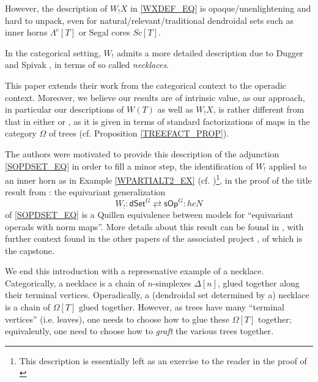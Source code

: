 \documentclass[a4paper,10pt
,draft
]{article}%
\numberwithin{equation}{section}
\numberwithin{figure}{section}
\theoremstyle{definition} %
\newcommand{\sOp}{\ensuremath{\mathsf{sOp}}}%
\newcommand{\dSet}{\mathsf{dSet}}
\newcommand{\1}{\ensuremath{\mathbbm 1}}%
\begin{document}
However, the description of $W_!X$ in \eqref{WXDEF_EQ} is opaque/unenlightening and hard to unpack,
even for natural/relevant/traditional dendroidal sets such as inner horns $\Lambda^e[T]$ or Segal cores $Sc[T]$.

In the categorical setting,
$W_!$ admits 
a more detailed description due to Dugger and Spivak \cite{DS11},
in terms of so called \emph{necklaces}.

This paper extends their work 
from the categorical context to the operadic context.
Moreover, we believe our results are of intrinsic value,
as our approach, in particular our descriptions of $W(T)$ as well as $W_! X$,
is rather different from that in either \cite{CM13b} or \cite{DS11},
as it is given in terms of 
standard factorizations of maps in the
category $\Omega$ of trees
(cf. Proposition \ref{TREEFACT_PROP}).

The authors were motivated to provide this description of the adjunction \eqref{SOPDSET_EQ}
in order to fill a minor step,
the identification of $W_!$ applied to an inner horn as in Example \ref{WPARTIALT2_EX} (cf. \cite[Lem. \ref{TAS-WLEFTQPUSH LEM}]{BP_TAS})\footnote{\textcolor{OliveGreen}{This description is essentially left as an exercise to the reader in the proof of \cite[Prop. 4.5]{CM13b}}},
in the proof of the title result from \cite{BP_TAS}:
the equivariant generalization
\[
        W_! \colon \dSet^G \rightleftarrows \sOp^G \colon h c N           
\]
of \eqref{SOPDSET_EQ} is a Quillen equivalence between models for ``equivariant operads with norm maps''.
More details about this result can be found in \cite{BP_TAS},
with further context found in the other papers of the associated project \cite{Per18,BP_geo,BP_edss,BP_FCOP,BP_ACOP}, of which \cite{BP_TAS} is the capstone.\\


We end this introduction with a represenative example of a necklace.
Categorically, a necklace is a chain of $n$-simplexes $\Delta[n]$, glued together along their terminal vertices.
Operadically, a (dendroidal set determined by a) necklace is a chain of $\Omega[T]$ glued together.
However, as trees have many ``terminal vertices'' (i.e. leaves),
one needs to choose how to glue these $\Omega[T]$ together;
equivalently, one need to choose how to \textit{graft} the various trees together.
\end{document}
